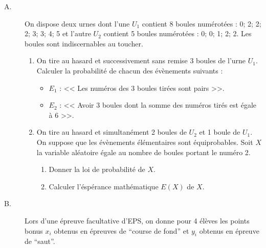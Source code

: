       \begin{description}
            \item[A. ] On dispose deux urnes dont l'une $U_1$ contient 8 boules num\'erot\'ees : 
                  0; 2; 2; 2; 3; 3; 4; 5 
                  et l'autre $U_2$ contient 5 boules num\'erot\'ees : 0; 0; 1; 2; 2.
                  Les boules sont indiscernables au toucher.
                  \begin{enumerate}
                        \item On tire au hasard et successivement sans remise 3 boules de l'urne $U_1$.
                              Calculer la probabilit\'e de chacun des \'ev\`enements suivants :
                              \begin{itemize}
                                    \item $E_1$ : << Les num\'eros des 3 boules tir\'ees sont pairs >>.
                                    \item $E_2$ : << Avoir 3 boules dont la somme des num\'eros tir\'es est \'egale \`a 6 >>.
                              \end{itemize}
                        \item On tire au hasard et simultan\'ement 2 boules de $U_2$ et 1 boule de $U_1$.
                              On suppose que les \'ev\`enements \'el\'ementaires sont \'equiprobables.
                              Soit $X$ la variable al\'eatoire \'egale au nombre de boules portant le num\'ero 2.
                              \begin{enumerate}
                                    \item Donner la loi de probabilit\'e de $X$.
                                    \item Calculer l'\'esp\'erance math\'ematique $E(X)$ de $X$.
                              \end{enumerate}
                  \end{enumerate}
            \item[B. ] Lors d'une \'epreuve facultative d'EPS, on donne pour 4 \'el\`eves les points bonus $x_i$ 
                  obtenus en \'epreuves de ``course de fond'' et $y_i$ obtenus en \'epreuve de ``saut''.


\end{description}

